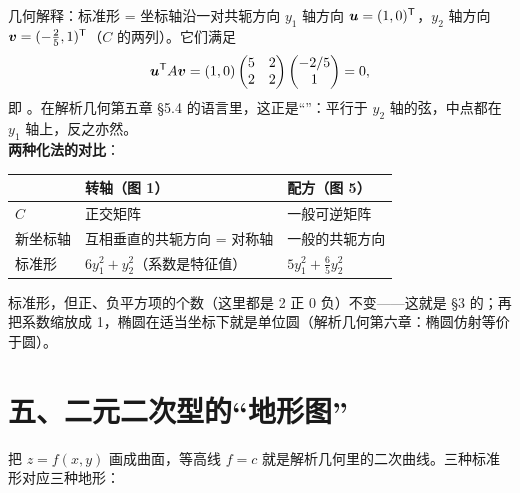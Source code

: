 \documentclass[11pt,a4paper,oneside,openany,fontset=none]{ctexbook}
\begin{document}
\begin{thmbox}{几何解释：标准形 = 坐标轴沿一对共轭方向}
$y_1$ 轴方向 $\boldsymbol{u}=(1,0)^{\mathsf T}$，$y_2$ 轴方向 $\boldsymbol{v}=(-\frac25,1)^{\mathsf T}$（$C$ 的两列）。它们满足
\[
\boldsymbol{u}^{\mathsf T} A\boldsymbol{v}=(1,0)\begin{pmatrix}5&2\\2&2\end{pmatrix}\begin{pmatrix}-2/5\\1\end{pmatrix}=0,
\]
即 。在解析几何第五章 \S5.4 的语言里，这正是“”：平行于 $y_2$ 轴的弦，中点都在 $y_1$ 轴上，反之亦然。\\[2pt]
\textbf{两种化法的对比}：
\begin{center}
\renewcommand{\arraystretch}{1.2}
\begin{tabular}{@{}lll@{}}
\toprule
 & 转轴（图 1） & 配方（图 5）\\\midrule
$C$ & 正交矩阵 & 一般可逆矩阵\\
新坐标轴 & 互相垂直的共轭方向 = 对称轴 & 一般的共轭方向\\
标准形 & $6y_1^2+y_2^2$（系数是特征值） & $5y_1^2+\frac65y_2^2$\\\bottomrule
\end{tabular}
\end{center}
标准形，但正、负平方项的个数（这里都是 2 正 0 负）不变——这就是 \S3 的；再把系数缩放成 1，椭圆在适当坐标下就是单位圆（解析几何第六章：椭圆仿射等价于圆）。
\end{thmbox}

\section*{五、二元二次型的“地形图”}

把 $z=f(x,y)$ 画成曲面，等高线 $f=c$ 就是解析几何里的二次曲线。三种标准形对应三种地形：
\end{document}
